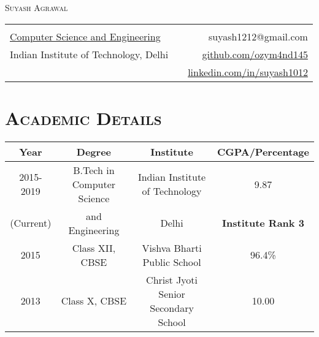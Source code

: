 \documentclass{article}
\newcommand{\tmpsection}[1]{}
\let\tmpsection=\section
\renewcommand{\section}[1]{\tmpsection*{\textsc{#1}}}
\begin{document}

\begin{center}
 {\Large \textsc{Suyash Agrawal} }\\ 
\begin{tabular}{ l p{8cm} r }
    & &   \\
  \href{http://www.cse.iitd.ernet.in/}{Computer Science and Engineering} & & suyash1212@gmail.com \\
  Indian Institute of Technology, Delhi
  & & \href{https://github.com/ozym4nd145/}{github.com/ozym4nd145} \\
  & & \href{https://www.linkedin.com/in/suyash1012}{linkedin.com/in/suyash1012}\\
\end{tabular}
\end{center}


\section{Academic Details}

\begin{center}
\begin{tabular}{ |c | c | c | c |}
\hline
Year & Degree & Institute & CGPA/Percentage \\ 
\hline
2015-2019 & B.Tech in Computer Science & Indian Institute of Technology & 9.87 \\ 
(Current) & and Engineering & Delhi & \textbf{Institute Rank 3}\\
\hline


2015 & Class XII, CBSE & Vishva Bharti Public School & 96.4\% \\ 

\hline
2013 & Class X, CBSE & Christ Jyoti Senior Secondary School & 10.00 \\  \hline
\end{tabular}
\end{center}
\end{document}
